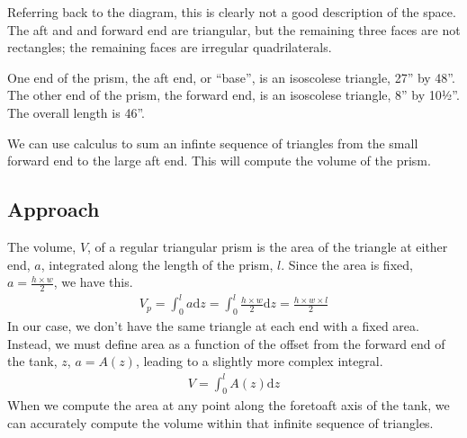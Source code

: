 \documentclass[letterpaper,10pt,english]{sphinxmanual}
\begin{document}
\sphinxAtStartPar
Referring back to the diagram, this is clearly not a good description of the space. The aft and and forward end are triangular, but the remaining three faces are not rectangles; the remaining faces are irregular quadrilaterals.

\sphinxAtStartPar
One end of the prism, the aft end, or “base”, is an isoscolese triangle, 27” by 48”.
The other end of the prism, the forward end, is an isoscolese triangle, 8” by 10½”.
The overall length is 46”.

\sphinxAtStartPar
We can use calculus to sum an infinte sequence of triangles from the small forward end to the large aft end. This will compute the volume of the prism.

\begin{sphinxVerbatim}[commandchars=\\\{\}]
   
   
\end{sphinxVerbatim}


\subsection{Approach}
\label{\detokenize{prism-irregular:approach}}
\sphinxAtStartPar
The volume, \(V\), of a regular triangular prism is the area of the triangle at either end, \(a\), integrated along the length of the prism, \(l\).
Since the area is fixed, \(a = \frac{h \times w}{2}\), we have this.
\begin{equation*}
\begin{split}
V_p = \int_0^l a \text{d}z = \int_{0}^{l} \frac{{h \times w}}{{2}} \text{d}z = \frac{h \times w \times l}{2}
\end{split}
\end{equation*}
\sphinxAtStartPar
In our case, we don’t have the same triangle at each end with a fixed area. Instead, we must define area as a function of the offset from the forward end of the tank, \(z\), \(a = A(z)\), leading to a slightly more complex integral.
\begin{equation*}
\begin{split}
V = \int_0^l A(z) \text{d}z
\end{split}
\end{equation*}
\sphinxAtStartPar
When we compute the area at any point along the fore\sphinxhyphen{}to\sphinxhyphen{}aft axis of the tank, we can accurately compute the volume within that infinite sequence of triangles.
\end{document}
